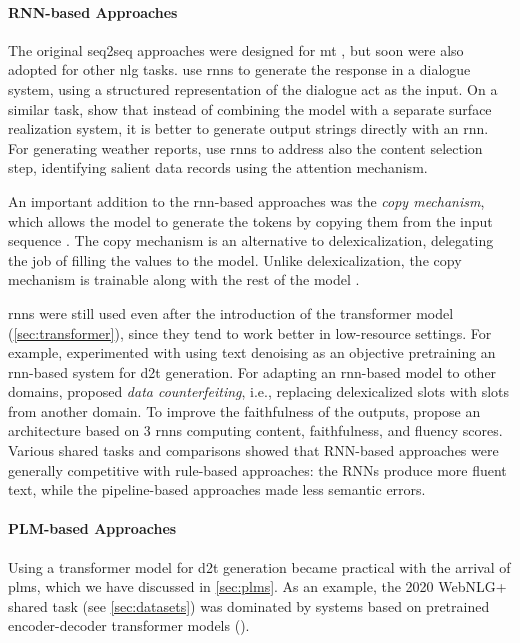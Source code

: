 {\paragraph{RNN-based Approaches} The original seq2seq approaches were designed for \ac{mt} \cite{cho2014learning,sutskever2014sequence}, but soon were also adopted for other \ac{nlg} tasks. \citet{wen2015semantically} use \acp{rnn} to generate the response in a dialogue system, using a structured representation of the dialogue act as the input. On a similar task, \citet{dusekSequencetoSequenceGenerationSpoken2016} show that instead of combining the model with a separate surface realization system, it is better to generate output strings directly with an \ac{rnn}. For generating weather reports, \citet{mei2016talk} use \acp{rnn} to address also the content selection step, identifying salient data records using the attention mechanism.

An important addition to the \ac{rnn}-based approaches was the \emph{copy mechanism}, which allows the model to generate the tokens by copying them from the input sequence \cite{gu2016incorporating,seeGetPointSummarization2017}. The copy mechanism is an alternative to delexicalization, delegating the job of filling the values to the model. Unlike delexicalization, the copy mechanism is trainable along with the rest of the model \cite{gehrmannEndtoEndContentPlan2018}.

\acp{rnn} were still used even after the introduction of the transformer model (\autoref{sec:transformer}), since they tend to work better in low-resource settings. For example, \citet{freitagUnsupervisedNaturalLanguage2018} experimented with using text denoising as an objective pretraining an \ac{rnn}-based system for \ac{d2t} generation. For adapting an \ac{rnn}-based model to other domains, \citet{wen2020recurrent} proposed \emph{data counterfeiting}, i.e., replacing delexicalized slots with slots from another domain. To improve the faithfulness of the outputs, \citet{rebuffel2021controlling} propose an architecture based on 3 \acp{rnn} computing content, faithfulness, and fluency scores. Various shared tasks and comparisons \cite{gardentWebNLGChallengeGenerating2017,dusekEvaluatingStateoftheartEndtoEnd2020,ferreiraNeuralDatatotextGeneration2019} showed that RNN-based approaches were generally competitive with rule-based approaches: the RNNs produce more fluent text, while the pipeline-based approaches made less semantic errors.


\paragraph{PLM-based Approaches} Using a transformer model for \ac{d2t} generation became practical with the arrival of \acp{plm}, which we have discussed in \autoref{sec:plms}. As an example, the 2020 WebNLG+ shared task (see \autoref{sec:datasets}) was dominated by systems based on pretrained encoder-decoder transformer models (\citealp{ferreira20202020,yang2020improving,agarwalMachineTranslationAided2020,kasnerTrainHardFinetune2020}).

}
